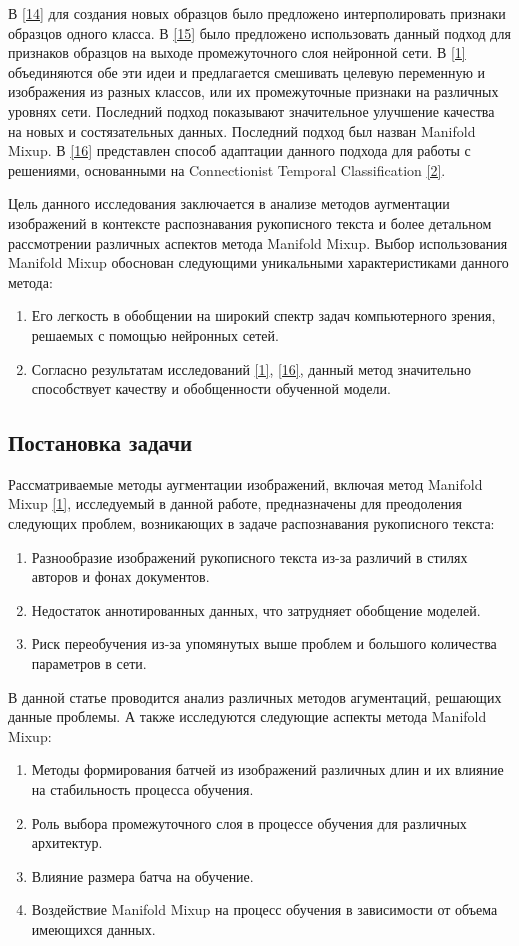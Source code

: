 В \hyperlink{cite.Cha11}{[14]} для создания новых образцов было предложено интерполировать признаки образцов одного класса. В \hyperlink{cite.Dev17}{[15]} было предложено использовать данный подход для признаков образцов на выходе промежуточного слоя нейронной сети. В \hyperlink{cite.Ver18}{[1]} объединяются обе эти идеи и предлагается смешивать целевую переменную и изображения из разных классов, или их промежуточные признаки на различных уровнях сети. Последний подход показывают значительное улучшение качества на новых и состязательных данных. Последний подход был назван Manifold Mixup. В \hyperlink{cite.Bas19}{[16]} представлен способ адаптации данного подхода для работы с решениями, основанными на Connectionist Temporal Classification \hyperlink{cite.Gra06}{[2]}.

Цель данного исследования заключается в анализе методов аугментации изображений в контексте распознавания рукописного текста и более детальном рассмотрении различных аспектов метода Manifold Mixup. Выбор использования Manifold Mixup обоснован следующими уникальными характеристиками данного метода:
\begin{enumerate}
\item Его легкость в обобщении на широкий спектр задач компьютерного зрения, решаемых с помощью нейронных сетей.
\item Согласно результатам исследований \hyperlink{cite.Ver18}{[1]}, \hyperlink{cite.Bas19}{[16]}, данный метод значительно способствует качеству и обобщенности обученной модели.
\end{enumerate}
 
\subsection{Постановка задачи}
Рассматриваемые методы аугментации изображений, включая метод Manifold Mixup \hyperlink{cite.Ver18}{[1]}, исследуемый в данной работе, предназначены для преодоления следующих проблем, возникающих в задаче распознавания рукописного текста:
\begin{enumerate}
\item Разнообразие изображений рукописного текста из-за различий в стилях авторов и фонах документов.
\item Недостаток аннотированных данных, что затрудняет обобщение моделей.
\item Риск переобучения из-за упомянутых выше проблем и большого количества параметров в сети.
\end{enumerate}
В данной статье проводится анализ различных методов агументаций, решающих данные проблемы. А также исследуются следующие аспекты метода Manifold Mixup:
\begin{enumerate}
\item Методы формирования батчей из изображений различных длин и их влияние на стабильность процесса обучения.
\item Роль выбора промежуточного слоя в процессе обучения для различных архитектур.
\item Влияние размера батча на обучение.
\item Воздействие Manifold Mixup на процесс обучения в зависимости от объема имеющихся данных.
\end{enumerate}

